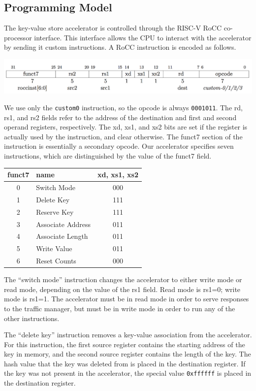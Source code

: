 \subsection{Programming Model}

The key-value store accelerator is controlled through the RISC-V RoCC
co-processor interface. This interface allows the CPU to interact with the
accelerator by sending it custom instructions. A RoCC instruction is encoded
as follows.

\includegraphics[width=0.9\linewidth]{../../img/rocc-encoding.png}

We use only the \texttt{custom0} instruction, so the opcode is always
\texttt{0001011}.
The rd, rs1, and rs2 fields refer to the address of the destination and
first and second operand registers, respectively. The xd, xs1, and xs2 bits
are set if the register is actually used by the instruction, and clear
otherwise. The funct7 section of the instruction is essentially a secondary
opcode. Our accelerator specifies seven instructions, which are distinguished
by the value of the funct7 field.

\begin{tabular}{|c|l|c|}
    \hline
    funct7 & name & xd, xs1, xs2 \\
    \hline
    0 & Switch Mode & 000 \\
    1 & Delete Key & 111 \\
    2 & Reserve Key & 111 \\
    3 & Associate Address & 011 \\
    4 & Associate Length & 011 \\
    5 & Write Value & 011 \\
    6 & Reset Counts & 000 \\
    \hline
\end{tabular}

The ``switch mode'' instruction changes the accelerator to either write mode or
read mode, depending on the value of the rs1 field. Read mode is rs1=0;
write mode is rs1=1. The accelerator must be in read mode in order to serve
responses to the traffic manager, but must be in write mode in order to run
any of the other instructions.

The ``delete key'' instruction removes a key-value association from the
accelerator. For this instruction, the first source register contains the
starting address of the key in memory, and the second source register contains
the length of the key. The hash value that the key was deleted from is placed
in the destination register. If the key was not present in the accelerator,
the special value \texttt{0xffffff} is placed in the destination register.

